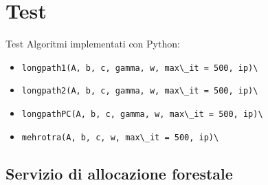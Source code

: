 \section{Test}
\begin{frame}{Test}
	Algoritmi implementati con Python:
	\begin{itemize}
	\item \verb!longpath1(A, b, c, gamma, w, max\_it = 500, ip)\!
	\item \verb!longpath2(A, b, c, gamma, w, max\_it = 500, ip)\!
	\item \verb!longpathPC(A, b, c, gamma, w, max\_it = 500, ip)\!
	\item \verb!mehrotra(A, b, c, w, max\_it = 500, ip)\!
	\end{itemize}
\end{frame}
\subsection{Servizio di allocazione forestale}


